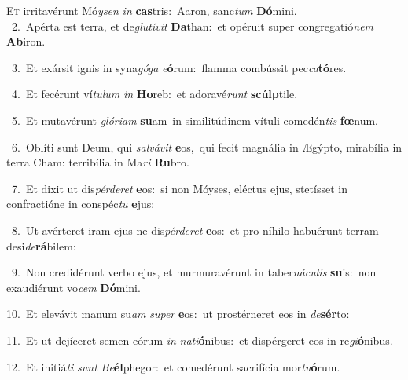 \lettrine{\initial\textcolor{\initialcolor}{E}}{t} irritavérunt Mó\-\textit{y}\-\textit{sen} \textit{in} \textbf{cas}\-tris:~\star Aaron, sanc\textit{tum} \textbf{Dó}\-mini.\\
{\numbfont\textcolor{\numbcolor}{~2.}}~Apérta est terra, et de\-\textit{glu}\-\textit{tí}\textit{vit} \textbf{Da}\-than:~\star et opéruit super congregatió\textit{nem} \textbf{Ab}\-iron.\par
{\numbfont\textcolor{\numbcolor}{~3.}}~Et exársit ignis in syna\-\textit{gó}\-\textit{ga} \textit{e}\-\textbf{ó}rum:~\star flamma combússit pec\-\textit{ca}\-\textbf{tó}res.\par
{\numbfont\textcolor{\numbcolor}{~4.}}~Et fecérunt ví\-\textit{tu}\-\textit{lum} \textit{in} \textbf{Ho}\-reb:~\star et adoravé\textit{runt} \textbf{scúlp}\-tile.\par
{\numbfont\textcolor{\numbcolor}{~5.}}~Et mutavérunt \textit{gló}\-\textit{ri}\textit{am} \textbf{su}\-am~\star in similitúdinem vítuli comedén\textit{tis} \textbf{fœ}\-num.\par
{\numbfont\textcolor{\numbcolor}{~6.}}~Oblíti sunt Deum, qui \textit{sal}\-\textit{vá}\textit{vit} \textbf{e}\-os,~\star qui fecit magnália in Ægýpto, mirabília in terra Cham: terribília in Ma\textit{ri} \textbf{Ru}\-bro.\par
{\numbfont\textcolor{\numbcolor}{~7.}}~Et dixit ut dis\-\textit{pér}\-\textit{de}\textit{ret} \textbf{e}\-os:~\star si non Móyses, eléctus ejus, stetísset in confractióne in conspéc\textit{tu} \textbf{e}\-jus:\par
{\numbfont\textcolor{\numbcolor}{~8.}}~Ut avérteret iram ejus ne dis\-\textit{pér}\-\textit{de}\textit{ret} \textbf{e}\-os:~\star et pro níhilo habuérunt terram desi\-\textit{de}\-\textbf{rá}bilem:\par
{\numbfont\textcolor{\numbcolor}{~9.}}~Non credidérunt verbo ejus, et murmuravérunt in taber\-\textit{ná}\-\textit{cu}\textit{lis} \textbf{su}\-is:~\star non exaudiérunt vo\textit{cem} \textbf{Dó}\-mini.\par
{\numbfont\textcolor{\numbcolor}{10.}}~Et elevávit manum su\textit{am} \textit{su}\-\textit{per} \textbf{e}\-os:~\star ut prostérneret eos in \textit{de}\-\textbf{sér}to:\par
{\numbfont\textcolor{\numbcolor}{11.}}~Et ut dejíceret semen eórum \textit{in} \textit{na}\-\textit{ti}\textbf{ó}nibus:~\star et dispérgeret eos in re\-\textit{gi}\-\textbf{ó}nibus.\par
{\numbfont\textcolor{\numbcolor}{12.}}~Et initiá\textit{ti} \textit{sunt} \textit{Be}\-\textbf{él}phegor:~\star et comedérunt sacrifícia mor\-\textit{tu}\-\textbf{ó}rum.\par
